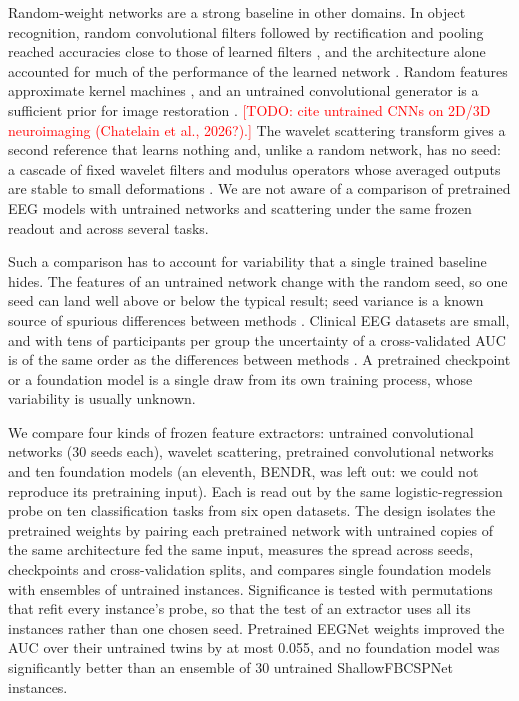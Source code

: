 \documentclass[11pt]{article}
\newcommand{\todo}[1]{\textcolor{red}{[TODO: #1]}}
\begin{document}
Random-weight networks are a strong baseline in other domains. In object recognition, random
convolutional filters followed by rectification and pooling reached accuracies close to those of
learned filters \citep{jarrett2009}, and the architecture alone accounted for much of the
performance of the learned network \citep{saxe2011}. Random features approximate kernel machines
\citep{rahimi2007}, and an untrained convolutional generator is a sufficient prior for image
restoration \citep{ulyanov2018}. \todo{cite untrained CNNs on 2D/3D neuroimaging (Chatelain et
al., 2026?).} The wavelet scattering transform gives a second reference that learns nothing and,
unlike a random network, has no seed: a cascade of fixed wavelet filters and modulus operators whose
averaged outputs are stable to small deformations \citep{mallat2012, anden2014}. We are not aware of
a comparison of pretrained EEG models with untrained networks and scattering under the same frozen
readout and across several tasks.

Such a comparison has to account for variability that a single trained baseline hides. The
features of an untrained network change with the random seed, so one seed can land well above or
below the typical result; seed variance is a known source of spurious differences between methods
\citep{bouthillier2021}. Clinical EEG datasets are small, and with tens of participants per group
the uncertainty of a cross-validated AUC is of the same order as the differences between methods
\citep{varoquaux2018}. A pretrained checkpoint or a foundation model is a single draw from its own
training process, whose variability is usually unknown.

We compare four kinds of frozen feature extractors: untrained convolutional networks (30 seeds
each), wavelet scattering, pretrained convolutional networks and ten foundation models (an eleventh, BENDR, was left out: we could not reproduce its
pretraining input). Each is
read out by the same logistic-regression probe on ten classification tasks from six open datasets.
The design isolates the pretrained weights by pairing each pretrained network with untrained copies
of the same architecture fed the same input, measures the spread across seeds, checkpoints and
cross-validation splits, and compares single foundation models with ensembles of untrained instances.
Significance is tested with permutations that refit every instance's probe, so that the test of an
extractor uses all its instances rather than one chosen seed. Pretrained EEGNet weights improved the
AUC over their untrained twins by at most 0.055, and no foundation model was significantly better
than an ensemble of 30 untrained ShallowFBCSPNet instances.
\end{document}
